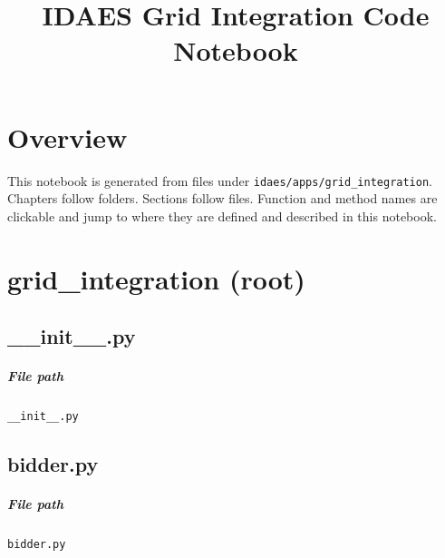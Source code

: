\documentclass[11pt]{report}
\title{IDAES Grid Integration Code Notebook}
\author{}
\date{}
\begin{document}
\maketitle
\tableofcontents

\chapter*{Overview}
This notebook is generated from files under \texttt{idaes/apps/grid\_integration}. Chapters follow folders. Sections follow files. Function and method names are clickable and jump to where they are defined and described in this notebook.

\chapter{grid\_integration (root)}
\section{\_\_init\_\_.py}
\label{file:__init__.py}
\paragraph{File path} \texttt{\_\_init\_\_.py}

\section{bidder.py}
\label{file:bidder.py}
\paragraph{File path} \texttt{bidder.py}
\end{document}
